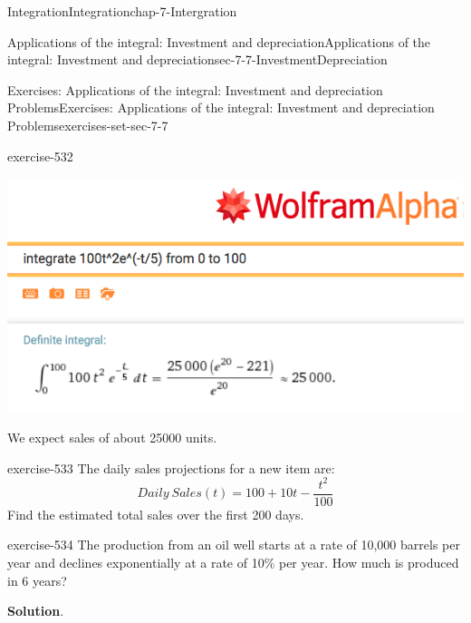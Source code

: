 \documentclass[oneside,10pt,]{book}
\numberwithin{equation}{section}
\begin{document}
\begin{chapterptx}{Integration}{}{Integration}{}{}{chap-7-Intergration}
\begin{sectionptx}{Applications of the integral: Investment and depreciation}{}{Applications of the integral: Investment and depreciation}{}{}{sec-7-7-InvestmentDepreciation}
\begin{exercises-subsection-numberless}{Exercises: Applications of the integral: Investment and depreciation Problems}{}{Exercises: Applications of the integral: Investment and depreciation Problems}{}{}{exercises-set-sec-7-7}
\begin{divisionexercise}{3}{}{}{exercise-532}
\begin{sidebyside}{1}{0.1}{0.1}{0}
\begin{sbspanel}{0.8}
\includegraphics[width=1\linewidth]{images/sec7-7-sol3a.png}
\end{sbspanel}%
\end{sidebyside}%
\par
\hypertarget{p-3059}{}%
We expect sales of about 25000 units.%
\end{divisionexercise}%
\begin{divisionexercise}{4}{}{}{exercise-533}%
\hypertarget{p-3060}{}%
The daily sales projections for a new item are:%
%
\begin{equation*}
Daily\ Sales(t)=100+10t-\frac{t^2}{100}
\end{equation*}
\hypertarget{p-3061}{}%
Find the estimated total sales over the first 200 days.%
\end{divisionexercise}%
\begin{divisionexercise}{5}{}{}{exercise-534}%
\hypertarget{p-3062}{}%
The production from an oil well starts at a rate of 10,000 barrels per year and declines exponentially at a rate of 10\% per year.  How much is produced in 6 years?%
\par\smallskip%
\noindent\textbf{Solution}.\hypertarget{solution-270}{}\quad%
\leavevmode%
\begin{sidebyside}{1}{0.1}{0.1}{0}%
\begin{sbspanel}{0.8}%

\end{sbspanel}
\end{sidebyside}
\end{divisionexercise}
\end{exercises-subsection-numberless}
\end{sectionptx}
\end{chapterptx}
\end{document}
